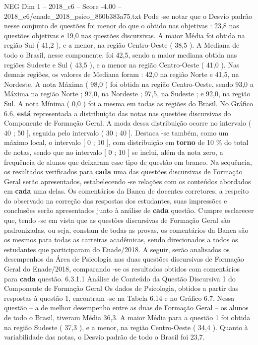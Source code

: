 \begin{textsample}{NEG Dim 1 – 2018\_c6 – Score -4.00 – 2018\_c6/enade\_2018\_psico\_860b383a75.txt}
Pode -se notar que o Desvio padrão nesse conjunto de questões foi menor do que o obtido nas objetivas : 23,8 nas questões objetivas e 19,0 nas questões discursivas.
A maior Média foi obtida na região Sul ( 41,2 ), e a menor, na região Centro-Oeste ( 38,5 ).
A Mediana de todo o Brasil, nesse componente, foi 42,5, sendo a maior mediana obtida nas regiões Sudeste e Sul ( 43,5 ), e a menor na região Centro-Oeste ( 41,0 ).
Nas demais regiões, os valores de Mediana foram : 42,0 na região Norte e 41,5, na Nordeste.
A nota Máxima ( 98,0 ) foi obtida na região Centro-Oeste, sendo 93,0 a Máxima na região Norte ; 97,0, na Nordeste ; 97,5, na Sudeste ; e 92,0, na região Sul.
A nota Mínima ( 0,0 ) foi a mesma em todas as regiões do Brasil.
No Gráfico 6.6, \textbf{está} representada a distribuição das notas nas questões discursivas do Componente de Formação Geral.
A moda dessa distribuição ocorre no intervalo ( 40 ; 50 ], seguida pelo intervalo ( 30 ; 40 ].
Destaca -se também, como um máximo local, o intervalo [ 0 ; 10 ], com distribuição em \textbf{torno} de 10 \% do total de notas, sendo que no intervalo [ 0 ; 10 ] se inclui, além da nota zero, a frequência de alunos que deixaram esse tipo de questão em branco.
Na sequência, os resultados verificados para \textbf{cada} uma das questões discursivas de Formação Geral serão apresentados, estabelecendo -se relações com os conteúdos abordados em \textbf{cada} uma delas.
Os comentários da Banca de docentes corretores, a respeito do observado na correção das respostas dos estudantes, suas impressões e conclusões serão apresentados junto à análise de \textbf{cada} questão.
Cumpre esclarecer que, tendo -se em vista que as questões discursivas de Formação Geral são padronizadas, ou seja, constam de todas as provas, os comentários da Banca são os mesmos para todas as carreiras acadêmicas, sendo direcionados a todos os estudantes que participaram do Enade/2018.
A seguir, serão analisados os desempenhos da Área de Psicologia nas duas questões discursivas de Formação Geral do Enade/2018, comparando -se os resultados obtidos com comentários para \textbf{cada} questão. 6.3.1.1 Análise de Conteúdo da Questão Discursiva 1 do Componente de Formação Geral Os dados de Psicologia, obtidos a partir das respostas à questão 1, encontram -se na Tabela 6.14 e no Gráfico 6.7.
Nessa questão – a de melhor desempenho entre as duas de Formação Geral – os alunos de todo o Brasil, tiveram Média 36,3.
A maior Média para a questão 1 foi obtida na região Sudeste ( 37,3 ), e a menor, na região Centro-Oeste ( 34,4 ).
Quanto à variabilidade das notas, o Desvio padrão de todo o Brasil foi 23,7.

\end{textsample}

